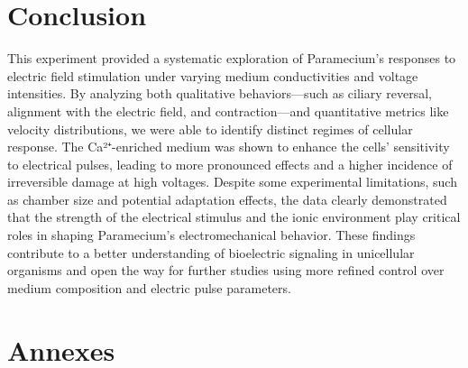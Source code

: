 


\section{Conclusion}

This experiment provided a systematic exploration of Paramecium’s responses to electric field stimulation under varying medium conductivities and voltage intensities. By analyzing both qualitative behaviors—such as ciliary reversal, alignment with the electric field, and contraction—and quantitative metrics like velocity distributions, we were able to identify distinct regimes of cellular response. The Ca²⁺-enriched medium was shown to enhance the cells' sensitivity to electrical pulses, leading to more pronounced effects and a higher incidence of irreversible damage at high voltages. Despite some experimental limitations, such as chamber size and potential adaptation effects, the data clearly demonstrated that the strength of the electrical stimulus and the ionic environment play critical roles in shaping Paramecium’s electromechanical behavior. These findings contribute to a better understanding of bioelectric signaling in unicellular organisms and open the way for further studies using more refined control over medium composition and electric pulse parameters.




\section{Annexes}

